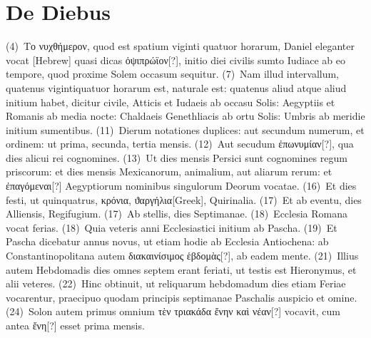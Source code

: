 \documentclass[draft,12pt,twoside,a4paper]{book}
\newcommand{\lnr}[1]{\nrfont({#1})~\normalfont}
\begin{document}
\section{De Diebus}
\lnr{4}\textgreek{Το νυχθήμερον},
quod est spatium viginti quatuor horarum, Daniel
eleganter vocat \texthebrew{[Hebrew]} quasi dicas
 \textgreek{ὀψιπρώϊον[?]}, initio diei civilis
sumto Iudiace ab eo tempore, quod proxime Solem occasum
sequitur.
\lnr{7}Nam illud intervallum, quatenus vigintiquatuor horarum est,
naturale est: quatenus aliud atque aliud initium habet, dicitur civile,
Atticis et Iudaeis ab occasu Solis: Aegyptiis et Romanis ab media nocte:
Chaldaeis Genethliacis ab ortu Solis: Umbris ab meridie initium
sumentibus.
\lnr{11}Dierum notationes duplices: aut secundum numerum, et
ordinem: ut prima, secunda, tertia mensis.
\lnr{12}Aut secudum \textgreek{ἐπωνυμίαν[?]},
qua dies alicui rei cognomines.
\lnr{13}Ut dies mensis Persici sunt cognomines
regum priscorum: et dies mensis Mexicanorum, animalium, aut aliarum
rerum: et \textgreek{ἐπαγόμεναι[?]} Aegyptiorum nominibus singulorum Deorum
vocatae.
\lnr{16}Et dies festi, ut quinquatrus, \textgreek{κρόνια},
\textgreek{ϑαργήλια[Greek]}, Quirinalia.
\lnr{17}Et ab eventu, dies Alliensis, Regifugium.
\lnr{17}Ab stellis, dies Septimanae.
\lnr{18}Ecclesia Romana vocat ferias.
\lnr{18}Quia veteris anni Ecclesiastici initium
ab Pascha.
\lnr{19}Et Pascha dicebatur annus novus, ut etiam hodie ab Ecclesia
Antiochena: ab Constantinopolitana autem \textgreek{διακαινίσιμος ἑβδομὰς[?]},
ab eadem mente.
%  
\lnr{21}Illius autem Hebdomadis dies omnes septem erant
feriati, ut testis est Hieronymus, et alii veteres.
\lnr{22}Hinc obtinuit, ut reliquarum
hebdomadum dies etiam Feriae vocarentur, praecipuo quodam
principis septimanae Paschalis auspicio et omine.
\lnr{24}Solon autem
primus omnium \textgreek{τὲν τριακάδα ἔνην καὶ νέαν[?]} vocavit,
 cum antea \textgreek{ἔνη[?]} esset
prima mensis.
\end{document}
